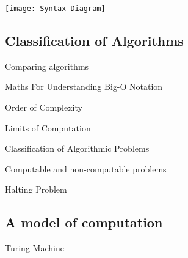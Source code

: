   \texttt{[image: Syntax-Diagram]}
  
\subsection{Classification of Algorithms}
  
  \noindent
  Comparing algorithms
  
  \noindent
  Maths For Understanding Big-O Notation
  
  \noindent
  Order of Complexity
  
  \noindent
  Limits of Computation
  
  \noindent
  Classification of Algorithmic Problems
  
  \noindent
  Computable and non-computable problems
  
  \noindent
  Halting Problem

\subsection{A model of computation}
  \noindent
  Turing Machine
